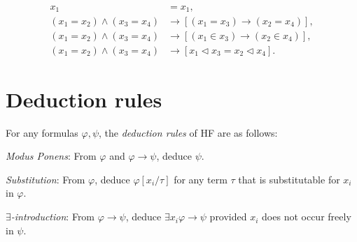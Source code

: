\begin{definition}
    \label{ax:Equality.Axiom}
    \leanok
    $$
    \begin{aligned}
        x_1 & = x_1, \\
        \left(x_1=x_2\right) \land \left(x_3=x_4\right) & 
        \rightarrow \left[\left(x_1=x_3\right) \rightarrow \left(x_2=x_4\right)\right], \\
        \left(x_1=x_2\right) \land \left(x_3=x_4\right) & 
        \rightarrow \left[\left(x_1 \in x_3\right) \rightarrow \left(x_2 \in x_4\right)\right], \\
        \left(x_1=x_2\right) \land \left(x_3=x_4\right) & 
        \rightarrow \left[x_1 \lhd x_3 = x_2 \lhd x_4 \right]. 
    \end{aligned}
    $$
\end{definition}

\section{Deduction rules}
\begin{definition}
    \label{ded:MP+Subst+ExIntro}
    For any formulas $\varphi, \psi$, the \textit{deduction rules} of HF are as follows:
    \begin{description}
        \item \textit{Modus Ponens}: 
        From $\varphi$ and $\varphi \rightarrow \psi$, deduce $\psi$.
        \item \textit{Substitution}:
        From $\varphi$, deduce $\varphi[x_i/\tau]$ for any term $\tau$ that is substitutable for
        $x_i$ in $\varphi$.
        \item \textit{$\exists$-introduction}:
        From $\varphi \rightarrow \psi$, deduce $\exists x_i \varphi \rightarrow \psi$ provided
        $x_i$ does not occur freely in $\psi$.
    \end{description}
\end{definition}

